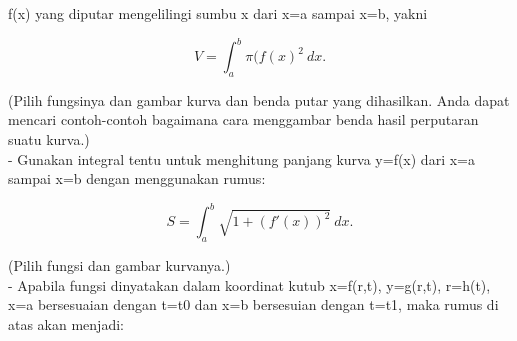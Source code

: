 \documentclass[12pt,arial,letterpaper]{book}
\begin{document}
\begin{eulercomment}
\begin{eulercomment}
\begin{eulercomment}
\begin{eulercomment}
\begin{eulercomment}
\begin{eulercomment}
\begin{eulercomment}
\begin{eulercomment}
\begin{eulercomment}
\begin{eulercomment}
\begin{eulercomment}
\begin{eulercomment}
\begin{eulercomment}
\begin{eulercomment}
\begin{eulercomment}
\begin{eulercomment}
\begin{eulercomment}
\begin{eulercomment}
\begin{eulercomment}
\begin{eulercomment}
\begin{eulercomment}
\begin{eulercomment}
\begin{eulercomment}
f(x) yang diputar mengelilingi sumbu x dari x=a sampai x=b, yakni

\end{eulercomment}
\begin{eulerformula}
\[
V = \int_a^b \pi (f(x)^2\ dx.
\]
\end{eulerformula}
\begin{eulercomment}
(Pilih fungsinya dan gambar kurva dan benda putar yang dihasilkan.
Anda dapat mencari contoh-contoh bagaimana cara menggambar benda hasil
perputaran suatu kurva.)\\
- Gunakan integral tentu untuk menghitung panjang kurva y=f(x) dari
x=a sampai x=b dengan menggunakan rumus:

\end{eulercomment}
\begin{eulerformula}
\[
S = \int_a^b \sqrt{1+(f'(x))^2} \ dx.
\]
\end{eulerformula}
\begin{eulercomment}
(Pilih fungsi dan gambar kurvanya.)\\
- Apabila fungsi dinyatakan dalam koordinat kutub x=f(r,t), y=g(r,t),
r=h(t), x=a bersesuaian dengan t=t0 dan x=b bersesuian dengan t=t1,
maka rumus di atas akan menjadi:


\end{eulercomment}
\end{eulercomment}
\end{eulercomment}
\end{eulercomment}
\end{eulercomment}
\end{eulercomment}
\end{eulercomment}
\end{eulercomment}
\end{eulercomment}
\end{eulercomment}
\end{eulercomment}
\end{eulercomment}
\end{eulercomment}
\end{eulercomment}
\end{eulercomment}
\end{eulercomment}
\end{eulercomment}
\end{eulercomment}
\end{eulercomment}
\end{eulercomment}
\end{eulercomment}
\end{eulercomment}
\end{eulercomment}
\end{document}

